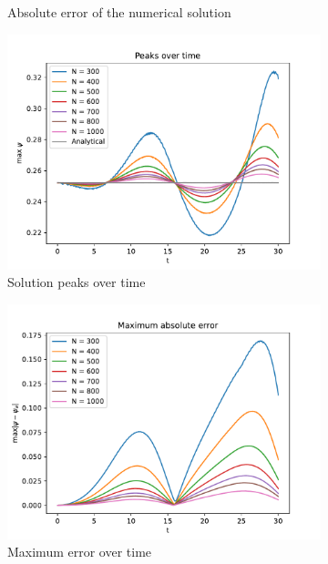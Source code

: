 \documentclass[12pt, a4paper]{article}
\begin{document}
\begin{figure}[hbtp]
\begin{subfigure}{0.5\textwidth}
  \caption{Absolute error of the numerical solution} \label{fig:b}
  \end{subfigure}
  \medskip
  \begin{subfigure}{0.5\textwidth}
  \includegraphics[width=\linewidth]{peaks.pdf}
  \caption{Solution peaks over time} \label{fig:c}
  \end{subfigure}
  \hspace*{\fill}
  \begin{subfigure}{0.5\textwidth}
  \includegraphics[width=\linewidth]{error_vs_time.pdf}
  \caption{Maximum error over time} \label{fig:d}
  \end{subfigure}
  \medskip
  \begin{subfigure}{0.5\textwidth}

\end{subfigure}
\end{figure}
\end{document}
